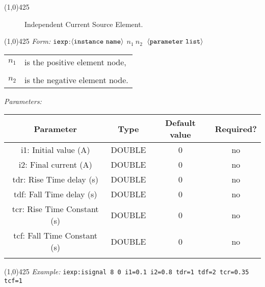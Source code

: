 \documentclass{article}
\begin{document}
\hrulefill\linethickness{0.5mm}\line(1,0){425}
\normalsize
\newline
\begin{figure}[h]
\centerline{\epsfxsize=0.5in}
\caption{Independent Current Source Element.}
\end{figure}
\newline
\linethickness{0.5mm} \line(1,0){425}
\newline
\textit{Form:}
\newline
$\tt iexp$:$\langle \tt{instance\ name}\rangle$ $n_1\ n_2\ $
$\langle \tt{parameter\ list}\rangle$
\newline
\begin{tabular}{r l}
$n_1$ & is the positive element node, \\
&  \\
$n_2$ & is the negative element node. \\
\end{tabular}
\newline
\textit{Parameters:}
\begin{table}[H]
\begin{tabular}{|c|c|c|c|}
\hline
Parameter&Type&Default value&Required?\\
\hline
i1: Initial value (A) & DOUBLE & 0 & no\\
\hline
i2: Final current (A) & DOUBLE & 0 & no\\
\hline
tdr: Rise Time delay (s) & DOUBLE & 0 & no\\
\hline
tdf: Fall Time delay (s) & DOUBLE & 0 & no\\
\hline
tcr: Rise Time Constant (s) & DOUBLE & 0 & no\\
\hline
tcf: Fall Time Constant (s) & DOUBLE & 0 & no\\
\par
\hline
\end{tabular}
\end{table}
\noindent\linethickness{0.5mm}\line(1,0){425}
\newline
\textit{Example:}
\newline
\texttt{iexp:isignal\ 8\ 0\ i1=0.1 i2=0.8 tdr=1 tdf=2 tcr=0.35
tcf=1}
\end{document}
